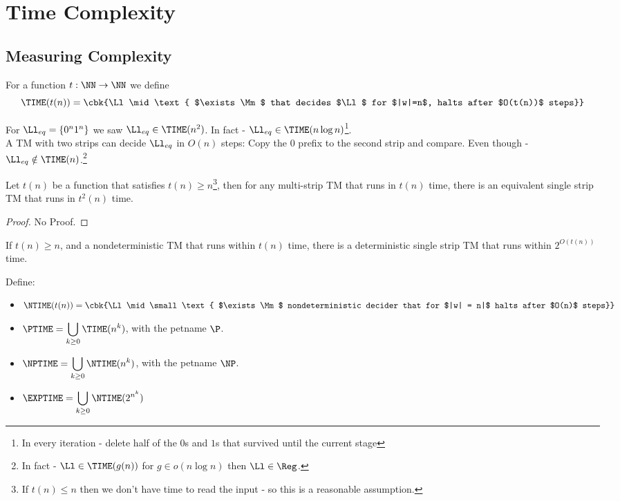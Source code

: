 \chapter{Time Complexity}
\section{Measuring Complexity}
\begin{yellowBox}
	\begin{defn}[\TIME]
		For a function $t:\NN\to \NN$ we define
		\[
		\TIME(t(n)) = \cbk{\Ll\mid\text{ $\exists\Mm$ that decides $\Ll$ for $|w|=n$, halts after $O(t(n))$ steps}}
		\]
	\end{defn}
\end{yellowBox}
\begin{example}
	For $\Ll_{eq} = \{0^n1^n\}$ we saw $\Ll_{eq}\in \TIME(n^2)$. In fact - $\Ll_{eq} \in \TIME(n\log n)$\footnote{In every iteration - delete half of the $0$s and $1$s that survived until the current stage}.\\
	A TM with two strips can decide $\Ll_{eq}$ in $O(n)$ steps: Copy the $0$ prefix to the second strip and compare. Even though - $\Ll_{eq}\notin \TIME(n)$.\footnote{In fact - $\Ll\in \TIME(g(n))$ for $g\in o(n\log n)$ then $\Ll\in \Reg$. }
\end{example}
\begin{blueBox}
	\begin{thm}
		Let $t(n)$ be a function that satisfies $t(n) \geq n$\footnote{If $t(n)\leq n$ then we don't have time to read the input - so this is a reasonable assumption.}, then for any multi-strip TM that runs in $t(n)$ time, there is an equivalent single strip TM that runs in $t^2(n)$ time.
	\end{thm}
\end{blueBox}
\begin{proof}
	No Proof.
\end{proof}
\begin{blueBox}
	\begin{thm}
		If $t(n) \geq n$, and a nondeterministic TM that runs within $t(n)$ time, there is a deterministic single strip TM that runs within $2^{O(t(n))}$ time.
	\end{thm}
\end{blueBox}
\begin{yellowBox}
	\begin{defn}
		Define:
		\begin{itemize}
			\item $\NTIME(t(n)) = \cbk{\Ll\mid\small\text{ $\exists\Mm$ nondeterministic decider that for $|w| = n|$ halts after $O(n)$ steps}}$
			\item $\PTIME = \displaystyle\bigcup_{k\geq 0}\TIME(n^k)$, with the petname $\P$.
			\item $\NPTIME = \displaystyle\bigcup_{k\geq 0}\NTIME(n^k)$, with the petname $\NP$.
			\item $\EXPTIME = \displaystyle\bigcup_{k\geq 0}\NTIME(2^{n^k})$
		\end{itemize}
	\end{defn}
\end{yellowBox}
